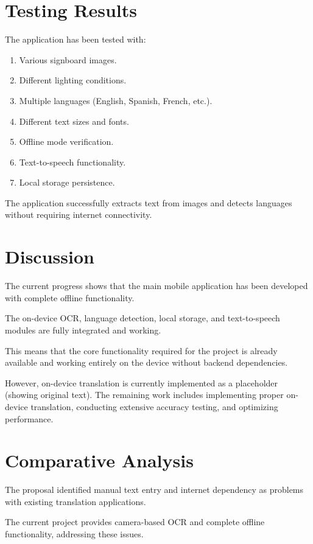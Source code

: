 \documentclass[12pt,a4paper]{report}
\begin{document}
\section{Testing Results}

The application has been tested with:

\begin{enumerate}
    \item Various signboard images.
    \item Different lighting conditions.
    \item Multiple languages (English, Spanish, French, etc.).
    \item Different text sizes and fonts.
    \item Offline mode verification.
    \item Text-to-speech functionality.
    \item Local storage persistence.
\end{enumerate}

The application successfully extracts text from images and detects languages without requiring internet connectivity.

\section{Discussion}

The current progress shows that the main mobile application has been developed with complete offline functionality.

The on-device OCR, language detection, local storage, and text-to-speech modules are fully integrated and working.

This means that the core functionality required for the project is already available and working entirely on the device without backend dependencies.

However, on-device translation is currently implemented as a placeholder (showing original text). The remaining work includes implementing proper on-device translation, conducting extensive accuracy testing, and optimizing performance.

\section{Comparative Analysis}

The proposal identified manual text entry and internet dependency as problems with existing translation applications.

The current project provides camera-based OCR and complete offline functionality, addressing these issues.
\end{document}
